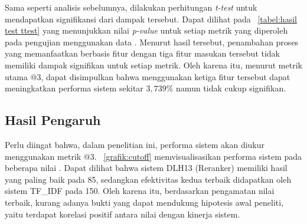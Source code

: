 Sama seperti analisis sebelumnya, dilakukan perhitungan \textit{t-test} untuk mendapatkan signifikansi dari dampak tersebut. Dapat dilihat pada \tabel{}~\ref{tabel:hasil test ttest} yang menunjukkan nilai \textit{p-value} untuk setiap metrik yang diperoleh pada pengujian menggunakan data \testing{}. Menurut hasil tersebut, penambahan proses \reranking{} yang memanfaatkan \reranker{} berbasis fitur dengan tiga fitur masukan tersebut tidak memiliki dampak signifikan untuk setiap metrik. Oleh karena itu, menurut metrik utama \recall{}$@3$, dapat disimpulkan bahwa \reranking{} menggunakan ketiga fitur tersebut dapat meningkatkan performa sistem \ir{} sekitar $3,739\%$ namun tidak cukup signifikan.
\begin{table}[H]
    \centering
    \caption{Hasil \textit{t-test} eksperimen pada data \testing{}}
    \label{tabel:hasil test ttest}
\end{table}





\subsection{Hasil Pengaruh \Cutoff{}}
\label{subbab:5::Hasil Pengaruh Cut-off}
Perlu diingat bahwa, dalam penelitian ini, performa sistem akan diukur menggunakan metrik \recall{}$@3$. \gambar{}~\ref{grafik:cutoff} memvisualisasikan performa sistem pada beberapa nilai \cutoff{}. Dapat dilihat bahwa sistem DLH13 (Reranker) memiliki hasil yang paling baik pada \cutoff{} 85, sedangkan efektivitas kedua terbaik didapatkan oleh sistem TF\_IDF pada \cutoff{} 150. Oleh karena itu, berdasarkan pengamatan nilai terbaik, kurang adanya bukti yang dapat mendukung hipotesis awal peneliti, yaitu terdapat korelasi positif antara nilai \cutoff{} dengan kinerja sistem.

